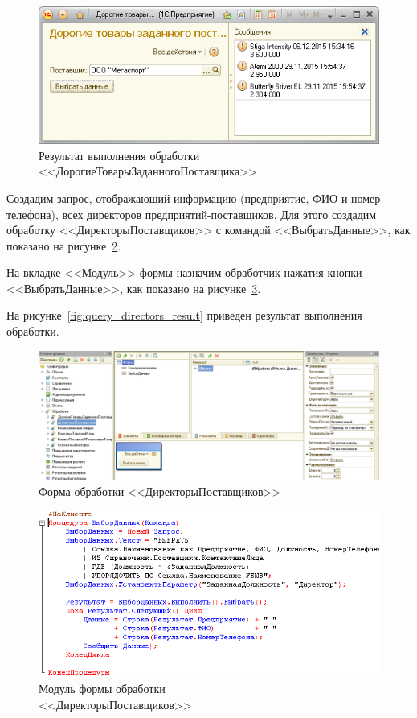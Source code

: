 \begin{figure}[h!]
  \centering
  \includegraphics[width=150mm]{pic/query_most_result}
  \caption{Результат выполнения обработки \\ <<ДорогиеТоварыЗаданногоПоставщика>>}
  \label{fig:query_most_result}
\end{figure}

\pagebreak

Создадим запрос, отображающий информацию (предприятие, ФИО и номер телефона),
всех директоров предприятий-поставщиков.
Для этого создадим обработку <<ДиректорыПоставщиков>>
с командой <<ВыбратьДанные>>,
как показано на рисунке~\ref{fig:query_directors_form}.

На вкладке <<Модуль>> формы назначим обработчик нажатия кнопки
<<ВыбратьДанные>>, как показано на рисунке~\ref{fig:query_directors_module}.

На рисунке~\ref{fig:query_directors_result} приведен результат
выполнения обработки.

\begin{figure}[h!]
  \centering
  \includegraphics[width=130mm]{pic/query_directors_form}
  \caption{Форма обработки <<ДиректорыПоставщиков>>}
  \label{fig:query_directors_form}
\end{figure}

\begin{figure}[h!]
  \centering
  \includegraphics[width=130mm]{pic/query_directors_module}
  \caption{Модуль формы обработки \\ <<ДиректорыПоставщиков>>}
  \label{fig:query_directors_module}
\end{figure}

